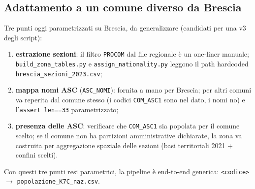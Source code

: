 \documentclass[11pt,a4paper]{article}
\newcommand{\code}[1]{\texttt{#1}}
\begin{document}
\subsection{Adattamento a un comune diverso da Brescia}
\label{sec:adapt}
Tre punti oggi parametrizzati su Brescia, da generalizzare (candidati per una
v3 degli script):
\begin{enumerate}[leftmargin=*,itemsep=1pt]
  \item \textbf{estrazione sezioni}: il filtro \code{PROCOM} dal file
  regionale \`e un one-liner manuale; \code{build\_zona\_tables.py} e
  \code{assign\_nationality.py} leggono il path hardcoded
  \code{brescia\_sezioni\_2023.csv};
  \item \textbf{mappa nomi ASC} (\code{ASC\_NOMI}): fornita a mano per
  Brescia; per altri comuni va reperita dal comune stesso (i codici
  \code{COM\_ASC1} sono nel dato, i nomi no) e l'\code{assert len==33}
  parametrizzato;
  \item \textbf{presenza delle ASC}: verificare che \code{COM\_ASC1} sia
  popolata per il comune scelto; se il comune non ha partizioni
  amministrative dichiarate, la zona va costruita per aggregazione
  spaziale delle sezioni (basi territoriali 2021 + confini scelti).
\end{enumerate}
Con questi tre punti resi parametrici, la pipeline \`e end-to-end generica:
\code{<codice>} $\to$ \code{popolazione\_K7C\_naz.csv}.

\end{document}
